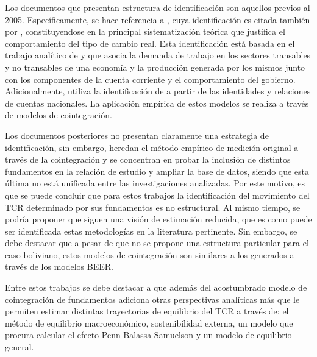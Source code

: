 \documentclass[12pt,letterpaper]{article}
\begin{document}
Los documentos que presentan estructura de identificación son aquellos previos al 2005. Específicamente, se hace referencia a \cite{lora2000tipo}, cuya identificación es citada también por \cite{marquez2003estimacion}, constituyendose en la principal sistematización teórica que justifica el comportamiento del tipo de cambio real. Esta identificación está basada en el trabajo analítico de \cite{baffes1999red} y \cite{hinkle1999exchange} que asocia la demanda de trabajo en los sectores transables y no transables de una economía y la producción generada por los mismos junto con los componentes de la cuenta corriente y el comportamiento del gobierno. Adicionalmente, \cite{humerez2005reexaminando} utiliza la identificación de \cite{elbadawi1994estimating} a partir de las identidades y relaciones de cuentas nacionales. La aplicación empírica de estos modelos se realiza a través de modelos de cointegración.

Los documentos posteriores no presentan claramente una estrategia de identificación, sin embargo, heredan el método empírico de medición original a través de la cointegración y se concentran en probar la inclusión de distintos fundamentos en la relación de estudio y ampliar la base de datos, siendo que esta última no está unificada entre las investigaciones analizadas. Por este motivo, es que se puede concluir que para estos trabajos la identificación del movimiento del TCR determinado por sus fundamentos es no estructural. Al mismo tiempo, se podría proponer que siguen una visión de estimación reducida, que es como puede ser identificada estas metodologías en la literatura pertinente. Sin embargo, se debe destacar que a pesar de que no se propone una estructura particular para el caso boliviano, estos modelos de cointegración son similares a los generados a través de los modelos BEER.

Entre estos trabajos se debe destacar a \cite{cerezo2011tipo} que además del acostumbrado modelo de cointegración de fundamentos adiciona otras perspectivas analíticas más que le permiten estimar distintas trayectorias de equilibrio del TCR a través de: el método de equilibrio macroeconómico, sostenibilidad externa, un modelo que procura calcular el efecto Penn-Balassa Samuelson y un modelo de equilibrio general.
\end{document}
